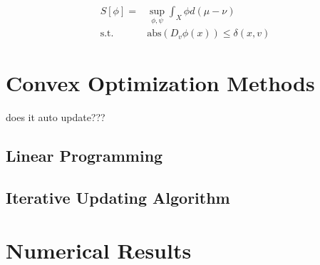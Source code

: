 \documentclass[12pt]{article}
\newcommand{\abs}{\text{abs}}
\begin{document}
\begin{align*}
S[\phi]=&\sup_{\phi,\psi} \int_X\phi d(\mu-\nu) \\
\text{s.t.} \quad & \abs(D_v\phi(x))\leq\delta(x,v)
\end{align*}



\section{Convex Optimization Methods}

does it auto update??? 


\subsection{Linear Programming}


\subsection{Iterative Updating Algorithm}


\section{Numerical Results}
 

\printbibliography
\end{document}
